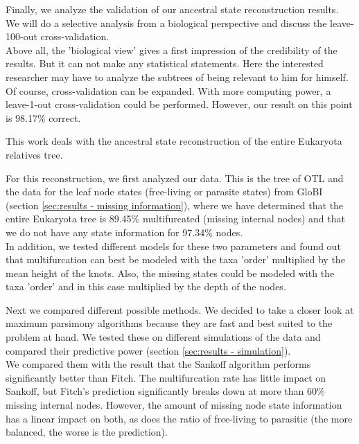     Finally, we analyze the validation of our ancestral state reconstruction results. We will do a 
      selective analysis from a biological perspective and discuss the leave-100-out 
      cross-validation. \\
    Above all, the 'biological view' gives a first impression of the credibility of the results. But 
      it can not make any statistical statements. Here the interested researcher may have to analyze 
      the subtrees of being relevant to him for himself. \\
    Of course, cross-validation can be expanded. With more computing power, a leave-1-out 
      cross-validation could be performed. However, our result on this point is 98.17\% correct. \\


  This work deals with the ancestral state reconstruction of the entire Eukaryota relatives tree.

  For this reconstruction, we first analyzed our data. This is the tree of OTL \cite{Hinchliff2015}
    and the data for the leaf node states (free-living or parasite states) from GloBI 
    \cite{Poelen2014} (section \ref{sec:results - missing information}), where we have determined 
    that the entire Eukaryota tree is 89.45\% multifurcated (missing internal nodes) and that we do 
    not have any state information for 97.34\% nodes. \\
  In addition, we tested different models for these two parameters and found out that multifurcation 
    can best be modeled with the taxa 'order' multiplied by the mean height of the knots. Also, the 
    missing states could be modeled with the taxa 'order' and in this case multiplied by the depth 
    of the nodes.
  
  Next we compared different possible methods. We decided to take a closer look at maximum parsimony 
    algorithms because they are fast and best suited to the problem at hand. We tested these on 
    different simulations of the data and compared their predictive power (section 
    \ref{sec:results - simulation}). \\
  We compared them with the result that the Sankoff algorithm performs significantly better than 
    Fitch. The multifurcation rate has little impact on Sankoff, but Fitch's prediction 
    significantly breaks down at more than 60\% missing internal nodes. However, the amount of 
    missing node state information has a linear impact on both, as does the ratio of free-living to 
    parasitic (the more balanced, the worse is the prediction).

